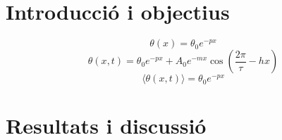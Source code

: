 \documentclass[12pt,twosides,onecolumn,openany]{article}
\begin{document}
\begin{multicols}{2}
\section{Introducció i objectius}
\begin{equation}\label{sol_estacionaria}
  \theta(x) = \theta_0e^{-px}
\end{equation}
\begin{equation}\label{sol_permanent}
  \theta(x,t) = \theta_0e^{-px} + A_0e^{-mx}\cos{\left( \frac{2\pi}{\tau} -hx \right)} 
\end{equation}
\begin{equation}\label{prom_temp}
  \langle \theta(x,t) \rangle = \theta_0e^{-px}  
\end{equation}
\section{Resultats i discussió}

\end{multicols}
\end{document}
